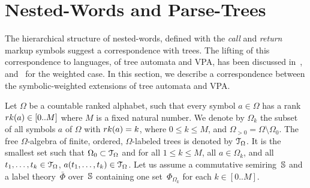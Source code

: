 \section{Nested-Words and Parse-Trees}
\label{sec:trees}
The hierarchical structure of nested-words, defined with the \emph{call} and \emph{return} markup symbols
suggest a correspondence with trees.
The lifting of this correspondence to languages, of tree automata and VPA,
has been discussed in~\cite{AlurMadhusudan09nested},
and~\cite{Caralp12VPAmult} for the weighted case.
In this section, we describe a correspondence between the symbolic-weighted extensions
of tree automata and VPA.

Let $\Omega$ be a countable ranked alphabet, such that
every symbol $a \in \Omega$ has a rank
$\rank(a) \in [0..M]$ where $M$ is a fixed natural number.
We denote by $\Omega_k$ the subset of all symbols $a$ of $\Omega$
with $\rank(a) = k$, where $0 \leq k \leq M$,
and $\Omega_{>0} = \Omega \setminus \Omega_0$.
%
\noindent
The free $\Omega$-algebra of finite, ordered,
$\Omega$-labeled trees is denoted by $\mathcal{T}_\Omega$.
It is the smallest set such that  $\Omega_0 \subset \mathcal{T}_\Omega$
and for all $1 \leq k \leq M$, all $a \in \Omega_k$,
and all $t_1, \ldots, t_k \in \mathcal{T}_\Omega$, $a(t_1, \ldots, t_k) \in \mathcal{T}_\Omega$.
%
%
Let us assume a commutative semiring~$\mathbb{S}$
and a label theory~$\bar{\Phi}$ over~$\mathbb{S}$
containing one set~$\Phi_{\Omega_k}$ for each $k \in [0..M]$.
%
\renewcommand{\call}[1]{\ensuremath \langle_{#1}}
\renewcommand{\return}[1]{\ensuremath {}_{#1}{\rangle}} %

